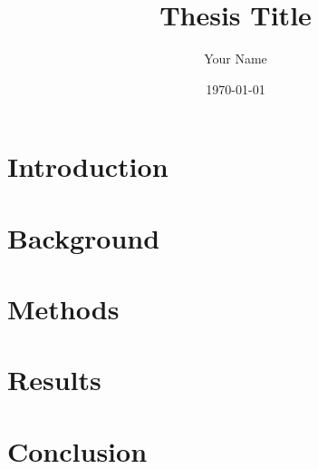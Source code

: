 \documentclass[12pt]{report}
\begin{document}
\title{Thesis Title}
\author{Your Name}
\date{\today}
\maketitle

\begin{abstract}
\end{abstract}

\tableofcontents
\chapter{Introduction}

\chapter{Background}

\chapter{Methods}

\chapter{Results}

\chapter{Conclusion}



\end{document}

